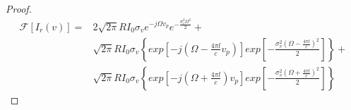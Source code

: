 \begin{proof}
\begin{equation}
\begin{aligned}
 \mathscr{F}\left[I_{r}(v)\right]=&2\sqrt{2\pi}RI_{0}\sigma_{v}e^{-j\Omega v_{p}}e^{-\frac{\sigma_{v}^{2}\Omega^{2}}{2}}+\\
 &  \sqrt{2\pi}RI_{0}\sigma_{v}\left\{exp\left[-j(\Omega-\frac{4\pi l}{c}v_{p}) \right ]exp\left[-\frac{\sigma^{2}_{v}(\Omega-\frac{4\pi l}{c})^{2}}{2} \right ] \right\}+ \\ 
 &  \sqrt{2\pi}RI_{0}\sigma_{v}\left\{exp\left[-j(\Omega+\frac{4\pi l}{c})v_{p} \right ]exp\left[-\frac{\sigma^{2}_{v}(\Omega+\frac{4\pi l}{c})^{2}}{2} \right ] \right\}
\end{aligned}
\end{equation}
\end{proof}